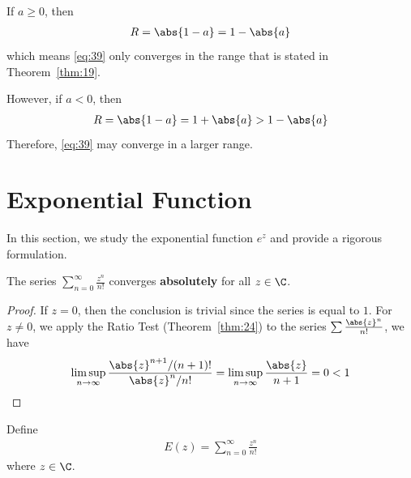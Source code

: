 \documentclass[thmcnt=section, 12pt]{elegantbook}
\begin{document}
\begin{example}
    \par If $a \geq 0$, then
    \begin{align*}
        R = \abs{1-a} = 1 - \abs{a}
    \end{align*}
    which means \eqref{eq:39} only converges in the range that is stated in Theorem~\ref{thm:19}.
    
    \par However, if $a < 0$, then
    \begin{align*}
        R = \abs{1-a} = 1 + \abs{a} > 1 - \abs{a}
    \end{align*}
    Therefore, \eqref{eq:39} may converge in a larger range.
\end{example}


\section{Exponential Function}

\par In this section, we study the exponential function $e^z$ and provide a rigorous formulation.


\begin{proposition} \label{pro:3}
    The series $\sum_{n=0}^\infty \frac{z^n}{n!}$ converges \textbf{absolutely} for all $z \in \C$.
\end{proposition}

\begin{proof}
    If $z = 0$, then the conclusion is trivial since the series is equal to $1$. For $z \neq 0$, we apply the Ratio Test (Theorem~\ref{thm:24}) to the series $\sum \frac{\abs{z}^n}{n!}$, we have 
    \begin{align*}
        \limsup_{n \to \infty} \frac{\abs{z}^{n+1} / (n+1)!}{\abs{z}^n / n!}
        = \limsup_{n \to \infty} \frac{\abs{z}}{n+1}
        = 0 < 1
    \end{align*}
\end{proof}


\begin{definition} \label{def:6}
    Define 
    \begin{align}
        E(z) = \sum_{n=0}^\infty \frac{z^n}{n!}
        \label{eq:50}
    \end{align}
    where $z \in \C$.
\end{definition}
\end{document}
